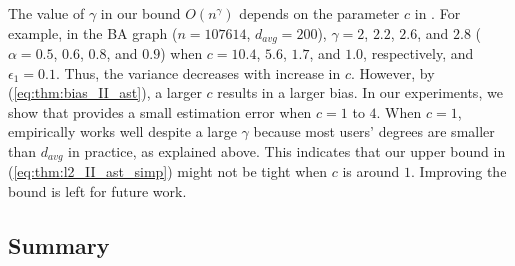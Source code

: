 The value of $\gamma$ in our bound $O(n^\gamma)$ depends on the parameter $c$ in \AlgWSTriVR{}.
For example, in the BA graph ($n=107614$, $d_{avg} = 200$), $\gamma=2$, $2.2$, $2.6$, and $2.8$ ($\alpha=0.5$, $0.6$, $0.8$, and $0.9$) when $c=10.4$, $5.6$, $1.7$, and $1.0$, respectively, and $\epsilon_1=0.1$.
Thus, the variance decreases with increase in $c$.
However, by (\ref{eq:thm:bias_II_ast}), a larger $c$ results in a larger bias. 
In our experiments, we show that \AlgWSTriVR{} provides a small estimation error when $c=1$ to $4$.
When $c=1$, \AlgWSTriVR{} empirically works well despite a large $\gamma$ because most users' degrees are smaller than $d_{avg}$ in practice, as explained above.
This indicates that our upper bound in (\ref{eq:thm:l2_II_ast_simp}) might not be tight when $c$ is around $1$.
Improving the bound is left for future work.



\subsection{Summary}
\label{sub:summary}

